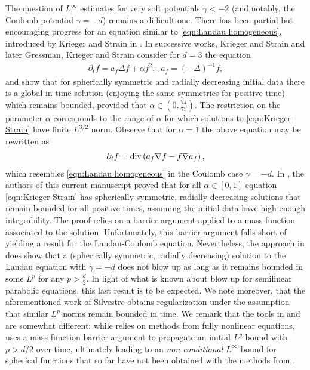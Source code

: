 \documentclass[12pt,american]{amsart}
\numberwithin{equation}{section}
\theoremstyle{plain}
\theoremstyle{definition}                  %
\def\dive{\textnormal{div}}
\begin{document}
The question of $L^\infty$ estimates for very soft potentials $\gamma<-2$ (and notably, the Coulomb potential $\gamma=-d$) remains a difficult one. There has been partial but encouraging progress for an equation similar to \eqref{eqn:Landau homogeneous}, introduced by Krieger and Strain in \cite{KriStr2012}. In successive works, Krieger and Strain \cite{KriStr2012} and later Gressman, Krieger and Strain \cite{GreKriStr2012} consider for $d=3$ the equation 
\begin{align}\label{eqn:Krieger-Strain}
  \partial_t f = a_f \Delta f + \alpha f^2,\;\;a_f = (-\Delta)^{-1}f,
\end{align}	
and show that for  spherically symmetric and radially decreasing initial data there is a global in time solution (enjoying the same symmetries for positive time) which remains bounded, provided that $\alpha \in (0,\tfrac{74}{75})$. The restriction on the parameter $\alpha$ corresponds to the range of $\alpha$ for which solutions to \eqref{eqn:Krieger-Strain} have finite $L^{3/2}$ norm. Observe that for $\alpha=1$ the above equation may be rewritten as
\begin{align*}
  \partial_t f = \dive\left ( a_f \nabla f -f\nabla a_f\right ),
\end{align*}	
which resembles \eqref{eqn:Landau homogeneous} in the Coulomb case $\gamma=-d$. In \cite{GuGu15}, the authors of this current manuscript proved that for all $\alpha \in [0,1]$ equation \eqref{eqn:Krieger-Strain} has spherically symmetric, radially decreasing solutions that remain bounded for all positive times, assuming the initial data have high enough integrability. The proof relies on a barrier argument applied to a mass function associated to the solution. Unfortunately, this barrier argument falls short of yielding a result for the Landau-Coulomb equation. Nevertheless, the approach in \cite{GuGu15} does show that a (spherically symmetric, radially decreasing) solution to the Landau equation with $\gamma=-d$ does not blow up as long as it remains bounded in some $L^p$ for any $p>\frac{d}{2}$. In light of what is known about blow up for semilinear parabolic equations, this last result is to be expected. We note moreover, that the aforementioned work of Silvestre \cite{Silvestre2015} obtains regularization under the assumption that similar $L^p$ norms remain bounded in time.  We remark that the tools in \cite{GuGu15} and \cite{Silvestre2015} are somewhat different: while \cite{Silvestre2015} relies on methods from fully nonlinear equations, \cite{GuGu15} uses a mass function barrier argument to propagate an initial $L^p$ bound with $p>d/2$ over time, ultimately leading to an {\em non conditional } $L^\infty$ bound for spherical functions that so far have not been obtained with the methods from \cite{Silvestre2015}.  
\end{document}
